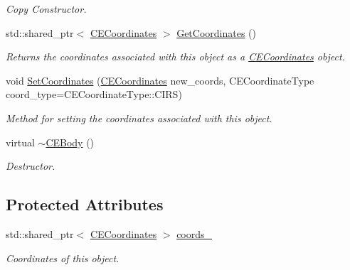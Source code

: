 \begin{DoxyCompactItemize}
\begin{DoxyCompactList}\small\item\em Copy Constructor. \end{DoxyCompactList}\item 
\hypertarget{class_c_e_body_afb139f461d8df01692deb6e9b90e69e1}{}std\+::shared\+\_\+ptr$<$ \hyperlink{class_c_e_coordinates}{C\+E\+Coordinates} $>$ \hyperlink{class_c_e_body_afb139f461d8df01692deb6e9b90e69e1}{Get\+Coordinates} ()\label{class_c_e_body_afb139f461d8df01692deb6e9b90e69e1}

\begin{DoxyCompactList}\small\item\em Returns the coordinates associated with this object as a \textquotesingle{}\hyperlink{class_c_e_coordinates}{C\+E\+Coordinates}\textquotesingle{} object. \end{DoxyCompactList}\item 
void \hyperlink{class_c_e_body_af94f3d5193c5dbc780d6d6193819d4b0}{Set\+Coordinates} (\hyperlink{class_c_e_coordinates}{C\+E\+Coordinates} new\+\_\+coords, C\+E\+Coordinate\+Type coord\+\_\+type=C\+E\+Coordinate\+Type\+::\+C\+I\+R\+S)
\begin{DoxyCompactList}\small\item\em Method for setting the coordinates associated with this object. \end{DoxyCompactList}\item 
\hypertarget{class_c_e_body_a28c9e7610a98aabf2d6eb8d06f7fa980}{}virtual \hyperlink{class_c_e_body_a28c9e7610a98aabf2d6eb8d06f7fa980}{$\sim$\+C\+E\+Body} ()\label{class_c_e_body_a28c9e7610a98aabf2d6eb8d06f7fa980}

\begin{DoxyCompactList}\small\item\em Destructor. \end{DoxyCompactList}\end{DoxyCompactItemize}
\subsection*{Protected Attributes}
\begin{DoxyCompactItemize}
\item 
\hypertarget{class_c_e_body_ad054d987e2287cc5946fda179dc2dea4}{}std\+::shared\+\_\+ptr$<$ \hyperlink{class_c_e_coordinates}{C\+E\+Coordinates} $>$ \hyperlink{class_c_e_body_ad054d987e2287cc5946fda179dc2dea4}{coords\+\_\+}\label{class_c_e_body_ad054d987e2287cc5946fda179dc2dea4}

\begin{DoxyCompactList}\small\item\em Coordinates of this object. \end{DoxyCompactList}\end{DoxyCompactItemize}


